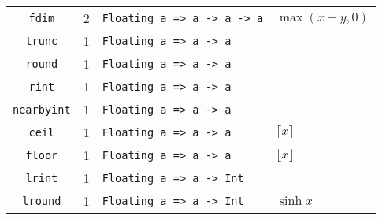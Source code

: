 \begin{longtable}[c]{ccll}
  \texttt{fdim} & 2 & \texttt{Floating a => a -> a -> a} & $\max(x-y, 0)$\\
  \texttt{trunc} & 1 & \texttt{Floating a => a -> a} & \\
  \texttt{round} & 1 & \texttt{Floating a => a -> a} & \\
  \texttt{rint} & 1 & \texttt{Floating a => a -> a} & \\
  \texttt{nearbyint} & 1 & \texttt{Floating a => a -> a} & \\
  \texttt{ceil} & 1 & \texttt{Floating a => a -> a} & $\lceil x \rceil$\\
  \texttt{floor} & 1 & \texttt{Floating a => a -> a} & $\lfloor x \rfloor$\\
  \texttt{lrint} & 1 & \texttt{Floating a => a -> Int} & \\
  \texttt{lround} & 1 & \texttt{Floating a => a -> Int} & $\sinh x$\\
  \bottomrule[1.5pt]
\end{longtable}
